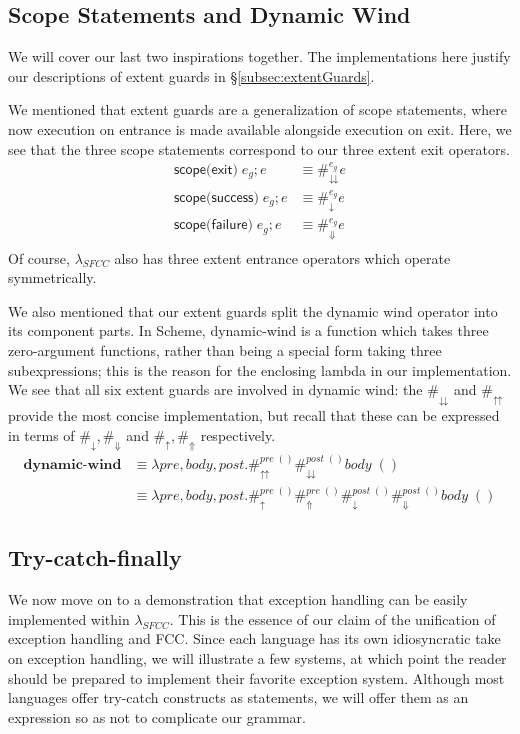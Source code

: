 \documentclass[11pt]{article}
\newcommand{\maybePage}{\null}
\begin{document}
\newpage %
\subsection{Scope Statements and Dynamic Wind}

We will cover our last two inspirations together.
The implementations here justify our descriptions of extent guards in \S\ref{subsec:extentGuards}.

We mentioned that extent guards are a generalization of scope statements, where now execution on entrance is made available alongside execution on exit.
Here, we see that the three scope statements correspond to our three extent exit operators.
\begin{align*}
\textsf{scope(exit)}\;e_g; e &\equiv \#_\downdownarrows^{e_g}e \\
\textsf{scope(success)}\;e_g; e &\equiv \#_\downarrow^{e_g}e \\
\textsf{scope(failure)}\;e_g; e &\equiv \#_\Downarrow^{e_g}e \\
\end{align*}
Of course, $\lambda_{SFCC}$ also has three extent entrance operators which operate symmetrically.

We also mentioned that our extent guards split the dynamic wind operator into its component parts.
In Scheme, dynamic-wind is a function which takes three zero-argument functions, rather than being a special form taking three subexpressions; this is the reason for the enclosing lambda in our implementation.
We see that all six extent guards are involved in dynamic wind:
the $\#_\downdownarrows$ and $\#_\upuparrows$ provide the most concise implementation, but recall that these can be expressed in terms of $\#_\downarrow, \#_\Downarrow$ and $\#_\uparrow, \#_\Uparrow$ respectively.
\begin{align*}
\textbf{dynamic-wind} &\equiv \lambda pre,body,post.
    \#_\upuparrows^{pre\;()}\#_\downdownarrows^{post\;()}body\;() \\
  &\equiv \lambda pre,body,post.
    \#_\uparrow^{pre\;()}\#_\Uparrow^{pre\;()}
    \#_\downarrow^{post\;()}\#_\Downarrow^{post\;()}
    body\;()
\end{align*}


\maybePage
\subsection{Try-catch-finally}
\label{subsec:implExn}

We now move on to a demonstration that exception handling can be easily implemented within $\lambda_{SFCC}$.
This is the essence of our claim of the unification of exception handling and FCC.
Since each language has its own idiosyncratic take on exception handling, we will illustrate a few systems, at which point the reader should be prepared to implement their favorite exception system.
Although most languages offer try-catch constructs as statements, we will offer them as an expression so as not to complicate our grammar.
\end{document}

